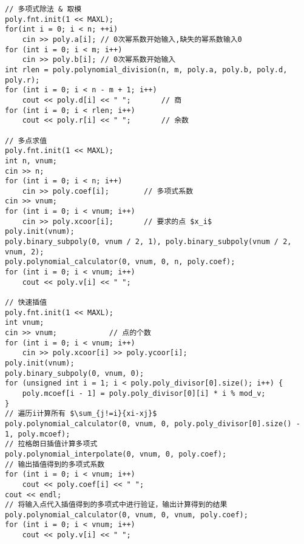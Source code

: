 \begin{verbatim}
// 多项式除法 & 取模
poly.fnt.init(1 << MAXL);
for(int i = 0; i < n; ++i)
    cin >> poly.a[i]; // 0次幂系数开始输入,缺失的幂系数输入0
for (int i = 0; i < m; i++)
    cin >> poly.b[i]; // 0次幂系数开始输入
int rlen = poly.polynomial_division(n, m, poly.a, poly.b, poly.d, poly.r);
for (int i = 0; i < n - m + 1; i++) 
    cout << poly.d[i] << " ";       // 商
for (int i = 0; i < rlen; i++)
    cout << poly.r[i] << " ";       // 余数

// 多点求值
poly.fnt.init(1 << MAXL);
int n, vnum; 
cin >> n;
for (int i = 0; i < n; i++)
    cin >> poly.coef[i];        // 多项式系数
cin >> vnum;
for (int i = 0; i < vnum; i++)
    cin >> poly.xcoor[i];       // 要求的点 $x_i$                                                                              
poly.init(vnum);
poly.binary_subpoly(0, vnum / 2, 1), poly.binary_subpoly(vnum / 2, vnum, 2); 
poly.polynomial_calculator(0, vnum, 0, n, poly.coef);
for (int i = 0; i < vnum; i++)
    cout << poly.v[i] << " ";

// 快速插值
poly.fnt.init(1 << MAXL);   
int vnum; 
cin >> vnum;            // 点的个数
for (int i = 0; i < vnum; i++)
    cin >> poly.xcoor[i] >> poly.ycoor[i];
poly.init(vnum);
poly.binary_subpoly(0, vnum, 0); 
for (unsigned int i = 1; i < poly.poly_divisor[0].size(); i++) {
    poly.mcoef[i - 1] = poly.poly_divisor[0][i] * i % mod_v;
}
// 遍历i计算所有 $\sum_{j!=i}{xi-xj}$
poly.polynomial_calculator(0, vnum, 0, poly.poly_divisor[0].size() - 1, poly.mcoef);
// 拉格朗日插值计算多项式
poly.polynomial_interpolate(0, vnum, 0, poly.coef);
// 输出插值得到的多项式系数 
for (int i = 0; i < vnum; i++)
    cout << poly.coef[i] << " ";
cout << endl;
// 将输入点代入插值得到的多项式中进行验证，输出计算得到的结果
poly.polynomial_calculator(0, vnum, 0, vnum, poly.coef);
for (int i = 0; i < vnum; i++)
    cout << poly.v[i] << " ";
\end{verbatim}